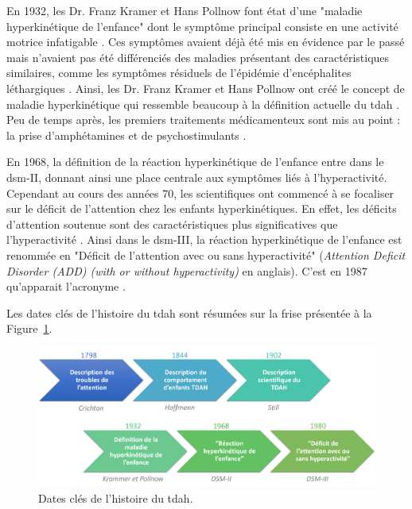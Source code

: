 En 1932, les Dr. Franz Kramer et Hans Pollnow font état d'une "maladie hyperkinétique de l'enfance" dont le symptôme principal consiste en une 
activité motrice infatigable \citep{Kramer1932}. Ces symptômes avaient déjà été mis en évidence par le passé mais n'avaient pas été différenciés 
des maladies présentant des caractéristiques similaires, comme les symptômes résiduels de l'épidémie d'encéphalites léthargiques \citep{Lange2010}. 
Ainsi, les Dr. Franz Kramer et Hans Pollnow ont créé le concept de maladie hyperkinétique qui ressemble beaucoup à la définition actuelle
du \gls{tdah} \citep{Lange2010}. Peu de temps après, les premiers traitements médicamenteux sont mis au point : la prise d'amphétamines 
\citep{Bradley1937} et de psychostimulants \citep{Morton2000}. 

En 1968, la définition de la réaction hyperkinétique de l'enfance entre dans le \gls{dsm}-II, donnant ainsi une place centrale aux symptômes liés 
à l'hyperactivité. Cependant au cours des années 70, les scientifiques ont commencé à se focaliser sur le déficit de l'attention chez les enfants
hyperkinétiques. En effet, les déficits d'attention soutenue sont des caractéristiques plus significatives que l'hyperactivité 
\citep{Barkley2006, Douglas1972}. Ainsi dans le \gls{dsm}-III, la réaction hyperkinétique de l'enfance est renommée en "Déficit de l'attention 
avec ou sans hyperactivité" (\textit{Attention Deficit Disorder (ADD) (with or without hyperactivity)} en anglais). C'est en 1987 qu'apparait
l'acronyme  \citep{Lange2010}. 

Les dates clés de l'histoire du \gls{tdah} sont résumées sur la frise présentée à la Figure~\ref{Figure:introduction_adhd_history}.

\begin{figure}[h!]
  \centering
	\includegraphics[width=1\linewidth]{figures/chapter-1/introduction-adhd-history} 
  \caption{Dates clés de l'histoire du \gls{tdah}.}
  \label{Figure:introduction_adhd_history}
\end{figure}

